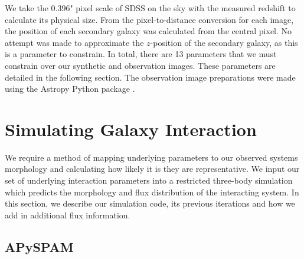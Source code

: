We take the 0.396" pixel scale of SDSS on the sky with the measured redshift to calculate its physical size. From the pixel-to-distance conversion for each image, the position of each secondary galaxy was calculated from the central pixel. No attempt was made to approximate the $z$-position of the secondary galaxy, as this is a parameter to constrain. In total, there are 13 parameters that we must constrain over our synthetic and observation images. These parameters are detailed in the following section. The observation image preparations were made using the Astropy Python package \citep{astropy_2013, astropy_2018}.

\section{Simulating Galaxy Interaction}\label{Methods: sims}
\noindent We require a method of mapping underlying parameters to our observed systems morphology and calculating how likely it is they are representative. We input our set of underlying interaction parameters into a restricted three-body simulation which predicts the morphology and flux distribution of the interacting system. In this section, we describe our simulation code, its previous iterations and how we add in additional flux information.

\subsection{APySPAM}\label{sec:simulations}
